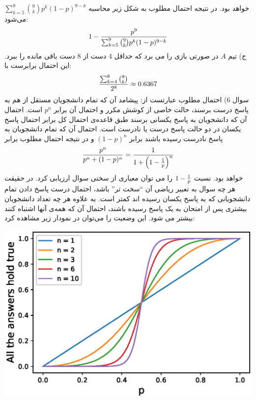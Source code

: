 \documentclass[10pt,letterpaper]{article}
\begin{document}
$
\sum_{k=5}^{9}\binom{9}{k}p^k(1-p)^{9-k}
$
 خواهد بود. در نتیجه احتمال مطلوب به شکل زیر محاسبه می‌شود:
$$
1-{p^9\over \sum_{k=5}^{9}\binom{9}{k}p^k(1-p)^{9-k}}
$$
ج) تیم $A$ در صورتی بازی را می برد که حداقل 4 دست از 8 دست باقی مانده را ببرد. این احتمال برابرست با:
$$
{\sum_{k=4}^{8}\binom{8}{k}\over 2^8}\approx 0.6367
$$
\np
سوال 6) احتمال مطلوب عبارتست از:
پیشامد آن که تمام دانشجویان مستقل از هم به پاسخ درست برسند، حالت خاصی از کوشش مکرر و احتمال آن برابر $p^n$ است. احتمال آن که دانشجویان به پاسخ یکسانی برسند طبق قاعده‌ی احتمال کل برابر احتمال پاسخ یکسان در دو حالت پاسخ درست یا نادرست است. احتمال آن که تمام دانشجویان به پاسخ نادرست رسیده باشند برابر $(1-p)^n$ و در نتیجه احتمال مطلوب برابر 
$$
{p^n\over p^n+(1-p)^n}={1\over 1+\left(1-{1\over p}\right)^n}
$$
خواهد بود. نسبت $1-{1\over p}$ را می توان معیاری از سختی سوال ارزیابی کرد. در حقیقت هر چه سوال به تعبیر ریاضی آن ``سخت تر'' باشد، احتمال درست پاسخ دادن تمام دانشجویانی که به پاسخ یکسان رسیده اند کمتر است. به علاوه هر چه تعداد دانشجویان بیشتری پس از امتحان به یک پاسخ رسیده باشند، احتمال آن که همه‌ی آنها اشتباه کنند بیشتر می شود. این وضعیت را می‌توان در نمودار زیر مشاهده کرد:
\begin{center}
\includegraphics{HW3_Q6.eps}
\end{center}
\end{document}
